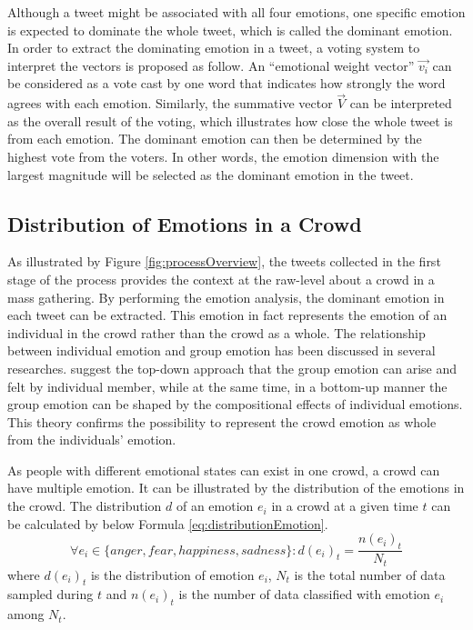Although a tweet might be associated with all four emotions, one specific emotion is expected to dominate the whole tweet, which is called the dominant emotion. In order to extract the dominating emotion in a tweet, a voting system to interpret the vectors is proposed as follow. An ``emotional weight vector'' \(\vec{v_i}\) can be considered as a vote cast by one word that indicates how strongly the word agrees with each emotion. Similarly, the summative vector \(\vec{V}\) can be interpreted as the overall result of the voting, which illustrates how close the whole tweet is from each emotion. The dominant emotion can then be determined by the highest vote from the voters. In other words, the emotion dimension with the largest magnitude will be selected as the dominant emotion in the tweet.

\subsection{Distribution of Emotions in a Crowd}
As illustrated by Figure \ref{fig:processOverview}, the tweets collected in the first stage of the process provides the context at the raw-level about a crowd in a mass gathering. By performing the emotion analysis, the dominant emotion in each tweet can be extracted. This emotion in fact represents the emotion of an individual in the crowd rather than the crowd as a whole. The relationship between individual emotion and group emotion has been discussed in several researches. \citet{barsade1998group} suggest the top-down approach that the group emotion can arise and felt by individual member, while at the same time, in a bottom-up manner the group emotion can be shaped by the compositional effects of individual emotions. This theory confirms the possibility to represent the crowd emotion as whole from the individuals' emotion.

As people with different emotional states can exist in one crowd, a crowd can have multiple emotion. It can be illustrated by the distribution of the emotions in the crowd. The distribution \(d\) of an emotion \(e_i\) in a crowd at a given time \(t\) can be calculated by below Formula \ref{eq:distributionEmotion}.
\begin{equation}
\label{eq:distributionEmotion}
	\forall e_i \in \{anger, fear, happiness, sadness\}: d(e_i)_t = \frac{n(e_i)_t}{N_t}
\end{equation}
where \(d(e_i)_t\) is the distribution of emotion \(e_i\), \(N_t\) is the total number of data sampled during \(t\) and \(n(e_i)_t\) is the number of data classified with emotion \(e_i\) among \(N_t\).

